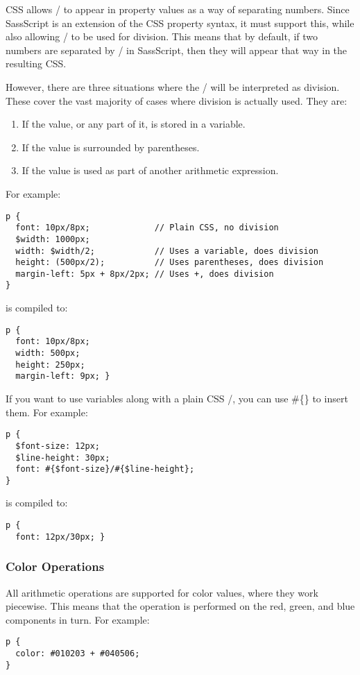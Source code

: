 \documentclass[10pt]{article}
\begin{document}
 CSS allows / to appear in property values as a way of separating numbers. Since SassScript is an extension of the CSS property syntax, it must support this, while also allowing / to be used for division. This means that by default, if two numbers are separated by / in SassScript, then they will appear that way in the resulting CSS.


 However, there are three situations where the / will be interpreted as division. These cover the vast majority of cases where division is actually used. They are:
\begin{enumerate}
\item If the value, or any part of it, is stored in a variable.
\item If the value is surrounded by parentheses.
\item If the value is used as part of another arithmetic expression.

\end{enumerate}


 For example:
\begin{verbatim}
p {
  font: 10px/8px;             // Plain CSS, no division
  $width: 1000px;
  width: $width/2;            // Uses a variable, does division
  height: (500px/2);          // Uses parentheses, does division
  margin-left: 5px + 8px/2px; // Uses +, does division
}
\end{verbatim}


 is compiled to:
\begin{verbatim}
p {
  font: 10px/8px;
  width: 500px;
  height: 250px;
  margin-left: 9px; }
\end{verbatim}


 If you want to use variables along with a plain CSS /, you can use \#\{\} to insert them. For example:
\begin{verbatim}
p {
  $font-size: 12px;
  $line-height: 30px;
  font: #{$font-size}/#{$line-height};
}
\end{verbatim}


 is compiled to:
\begin{verbatim}
p {
  font: 12px/30px; }
\end{verbatim}
\subsubsection{Color Operations}


 All arithmetic operations are supported for color values, where they work piecewise. This means that the operation is performed on the red, green, and blue components in turn. For example:
\begin{verbatim}
p {
  color: #010203 + #040506;
}
\end{verbatim}
\end{document}
